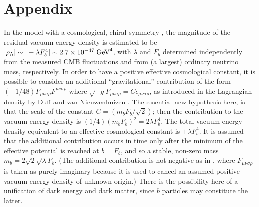 \section*{Appendix}
In the model with a cosmological, chiral symmetry \cite{ref1}, the magnitude of the residual
vacuum energy density is estimated to be $|\rho_\Lambda|\sim |-\lambda F_b^4| \sim 2.7 \times 10^{-47}\;\mbox{GeV}^4$,
with $\lambda$ and $F_b$ determined independently from the measured CMB fluctuations and from (a largest)
ordinary neutrino mass, respectively. In order to have a positive effective cosmological constant, it is
possible to consider an additional ``gravitational'' contribution of the form \cite{ref15,ref16} $(-1/48) F_{\mu\nu\sigma\rho}
F^{\mu\nu\sigma\rho}$ where $\sqrt{-g}F_{\mu\nu\sigma\rho} = C\epsilon_{\mu\nu\sigma\rho}$, as introduced
in the Lagrangian density by Duff and van Nieuwenhuizen \cite{ref15}. The essential new hypothesis here, 
is that the scale of the constant $C=(m_b F_b/\sqrt{2})$; then the contribution to the vacuum energy density
is $(1/4) (m_bF_b)^2 = 2\lambda F_b^4$. The total vacuum energy density equivalent to an effective cosmological
constant is $+\lambda F_b^4$. It is assumed that the additional contribution occurs in time only after the
minimum of the effective potential is reached at $b=F_b$, and so a stable, non-zero mass $m_b = 2\sqrt{2}\sqrt{\lambda}F_b$.
(The additional contribution is not negative as in \cite{ref16}, where $F_{\mu\nu\sigma\rho}$ is taken as purely
imaginary because it is used to cancel an assumed positive vacuum energy density of unknown origin.)
There is the possibility here of a unification of dark energy and dark matter, since $b$ particles
may constitute the latter.
%
